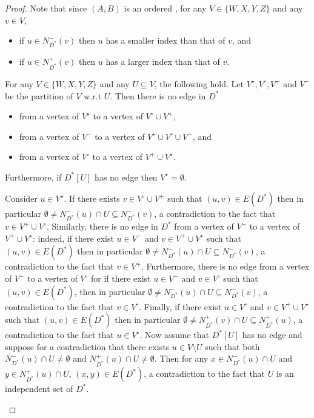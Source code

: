 \begin{proof}
Note that since $(A,B)$ is an ordered \toughpair, for any $V \in \{W,X,Y,Z\}$ and any $v \in V$, 
\begin{itemize}
\item if $u \in N^-_{D^*}(v)$ then $u$ has a smaller index than that of $v$, and
\item if $u \in N^+_{D^*}(v)$ then $u$ has a larger index than that of $v$. 
\end{itemize}

\begin{claim}
\label{clm:independent}
For any $V \in \{W,X,Y,Z\}$ and any $U \subseteq V$, the following hold.
Let $V^\star, V^\circ, V^+$ and $V^-$ be the partition of $V$ w.r.t $U$. Then there is no edge in $D^*$
\begin{itemize}
\item[(i)] from a vertex of $V^\star$ to a vertex of $V^\circ \cup V^+$, 
\item[(ii)] from a vertex of $V^-$ to a vertex of $V^\star \cup V^\circ \cup V^+$, and 
\item[(iii)] from a vertex of $V^\circ$ to a vertex of $V^+ \cup V^\star$.
\end{itemize}
Furthermore, if $D^*[U]$ has no edge then $V^\star = \emptyset$.
\end{claim}

\begin{claimproof}
Consider $u \in V^\star$. If there exists $v \in V^\circ \cup V^+$ such that $(u,v) \in E(D^*)$ then in particular $\emptyset \neq N^-_{D^*}(u) \cap U \subseteq N^-_{D^*}(v)$, a contradiction to the fact that $v \in V^+ \cup V^\circ$.
Similarly, there is no edge in $D^*$ from a vertex of $V^-$ to a vertex of $V^+ \cup V^\star$: indeed, if there exist $u \in V^-$ and $v\in V^+ \cup V^\star$ such that $(u,v) \in E(D^*)$ then in particular $\emptyset \neq N^-_{D^*}(u) \cap U \subseteq N^-_{D^*}(v)$, a contradiction to the fact that $v \in V^+$. Furthermore, there is no edge from a vertex of $V^-$ to a vertex of $V^\circ$ for if there exist $u \in V^-$ and $v \in V^\circ$ such that $(u,v) \in E(D^*)$, then in particular $\emptyset \neq N^-_{D^*}(u) \cap U \subseteq N^-_{D^*}(v)$, a contradiction to the fact that $v \in V^\circ$. Finally, if there exist $u \in V^\circ$ and $v \in V^+ \cup V^\star$ such that $(u,v) \in E(D^*)$ then in particular $\emptyset \neq N^+_{D^*}(v) \cap U \subseteq N^+_{D^*}(u)$, a contradiction to the fact that $u \in V^\circ$.
Now assume that $D^*[U]$ has no edge and suppose for a contradiction that there exists $u \in V \setminus U$ such that both $N^-_{D^*}(u) \cap U \neq \emptyset$ and $N^+_{D^*}(u) \cap U \neq \emptyset$. Then for any $x \in N^-_{D^*}(u) \cap U$ and $y \in N^+_{D^*}(u) \cap U$, $(x,y) \in E(D^*)$, a contradiction to the fact that $U$ is an independent set of $D^*$. 
\end{claimproof}


\end{proof}
